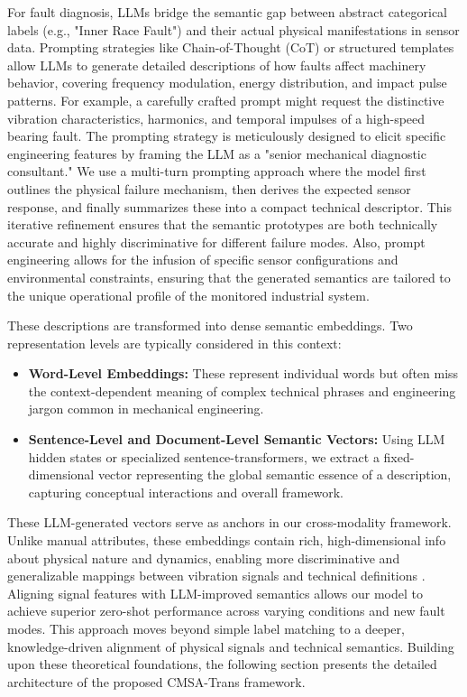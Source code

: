 \documentclass[journal]{IEEEtran}
\begin{document}
For fault diagnosis, LLMs bridge the semantic gap between abstract categorical labels (e.g., "Inner Race Fault") and their actual physical manifestations in sensor data. Prompting strategies like Chain-of-Thought (CoT) or structured templates allow LLMs to generate detailed descriptions of how faults affect machinery behavior, covering frequency modulation, energy distribution, and impact pulse patterns. For example, a carefully crafted prompt might request the distinctive vibration characteristics, harmonics, and temporal impulses of a high-speed bearing fault. The prompting strategy is meticulously designed to elicit specific engineering features by framing the LLM as a "senior mechanical diagnostic consultant." We use a multi-turn prompting approach where the model first outlines the physical failure mechanism, then derives the expected sensor response, and finally summarizes these into a compact technical descriptor. This iterative refinement ensures that the semantic prototypes are both technically accurate and highly discriminative for different failure modes. Also, prompt engineering allows for the infusion of specific sensor configurations and environmental constraints, ensuring that the generated semantics are tailored to the unique operational profile of the monitored industrial system.

These descriptions are transformed into dense semantic embeddings. Two representation levels are typically considered in this context:
\begin{itemize}
    \item \textbf{Word-Level Embeddings:} These represent individual words but often miss the context-dependent meaning of complex technical phrases and engineering jargon common in mechanical engineering.
    \item \textbf{Sentence-Level and Document-Level Semantic Vectors:} Using LLM hidden states or specialized sentence-transformers, we extract a fixed-dimensional vector representing the global semantic essence of a description, capturing conceptual interactions and overall framework.
\end{itemize}
These LLM-generated vectors serve as anchors in our cross-modality framework. Unlike manual attributes, these embeddings contain rich, high-dimensional info about physical nature and dynamics, enabling more discriminative and generalizable mappings between vibration signals and technical definitions \cite{brown2020language, devlin2018bert, li2024industrial}. Aligning signal features with LLM-improved semantics allows our model to achieve superior zero-shot performance across varying conditions and new fault modes. This approach moves beyond simple label matching to a deeper, knowledge-driven alignment of physical signals and technical semantics. Building upon these theoretical foundations, the following section presents the detailed architecture of the proposed CMSA-Trans framework.
\end{document}
